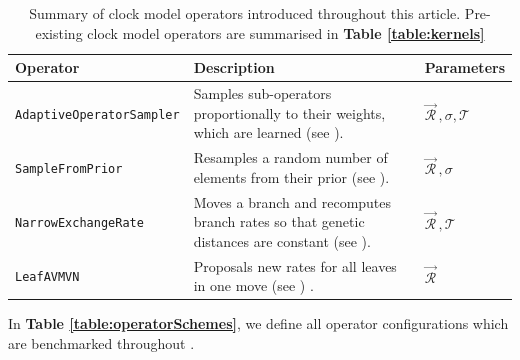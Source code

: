 \documentclass[10pt,letterpaper]{article}
\begin{document}
\begin{table}[h!]
\centering
\begin{tabular}{|l p{4cm} l|} 
 \hline
 Operator & Description & Parameters  \\
  \hline
 \texttt{AdaptiveOperatorSampler} & Samples sub-operators proportionally to their weights, which are learned (see \nameref{sect:adaptiveSampling}). & $\vec{\mathcal{R}}^{\,}, \sigma, \mathcal{T}$ \\
  \hline
 \texttt{SampleFromPrior} & Resamples a random number of elements from their prior (see \nameref{sect:adaptiveSampling}). & $\vec{\mathcal{R}}^{\,}, \sigma$ \\
  \hline
 \texttt{NarrowExchangeRate} & Moves a branch and recomputes branch rates so that genetic distances are constant (see \nameref{sect:NER}). & $\vec{\mathcal{R}}^{\,}, \mathcal{T}$\\
  \hline
 \texttt{LeafAVMVN}  & Proposals new rates for all leaves in one move (see \nameref{AVMVN_sect}) \cite{baele2017adaptive}. & $\vec{\mathcal{R}}^{\,}$ \\
  \hline
\end{tabular}
\caption{Summary of clock model operators introduced throughout this article. Pre-existing clock model operators are summarised in \textbf{Table \ref{table:kernels}}}
\label{table:newOperators}
\end{table}


In \textbf{Table \ref{table:operatorSchemes}}, we define all operator configurations which are benchmarked throughout \textbf{}.
\end{document}
